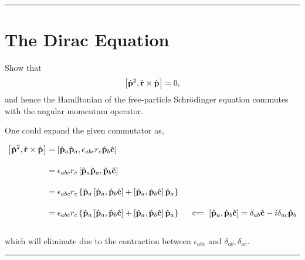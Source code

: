 
\noindent\rule{7in}{2.8pt}
\section{The Dirac Equation}
    
\begin{problem}{4.1}
Show that
\begin{align*}
    \left[ \hat{\mathbf{p}}^2,\hat{\mathbf{r}}\times \hat{\mathbf{p}}\right]=0,
\end{align*}
and hence the Hamiltonian of the free-particle Schrödinger equation commutes with the angular momentum operator.
\end{problem}
\begin{solution}
One could expand the given commutator as, 

\begin{align*}
    \left[ \hat{\mathbf{p}}^2 , \hat{\mathbf{r}} \times \hat{\mathbf{p}} \right] &=  \left[ \hat{\mathbf{p}}_a\hat{\mathbf{p}}_a,\epsilon_{abc}r_c \hat{\mathbf{p}}_b \hat{\mathbf{c}} \right]\\[0.15in]
        &= \epsilon_{abc}r_c \left[ \hat{\mathbf{p}}_a\hat{\mathbf{p}}_a,\hat{\mathbf{p}}_b \hat{\mathbf{c}} \right]\\[0.15in]
        &= \epsilon_{abc}r_c \left\{ \hat{\mathbf{p}}_a \left[ \hat{\mathbf{p}}_a,\hat{\mathbf{p}}_b \hat{\mathbf{c}} \right] + \left[ \hat{\mathbf{p}}_a,\hat{\mathbf{p}}_b \hat{\mathbf{c}} \right] \hat{\mathbf{p}}_a  \right\} \\[0.15in]
        &= \epsilon_{abc}r_c \left\{ \hat{\mathbf{p}}_a \left[ \hat{\mathbf{p}}_a,\hat{\mathbf{p}}_b \hat{\mathbf{c}} \right] + \left[ \hat{\mathbf{p}}_a,\hat{\mathbf{p}}_b \hat{\mathbf{c}} \right] \hat{\mathbf{p}}_a  \right\} \quad \impliedby  \left[ \hat{\mathbf{p}}_a,\hat{\mathbf{p}}_b \hat{\mathbf{c}} \right] = \delta_{ab} \hat{\mathbf{c}} - i \delta_{ac} \hat{\mathbf{p}}_b
\end{align*}\\
which will eliminate due to the contraction between $\epsilon_{abc}$ and $\delta_{ab},\delta_{ac}$. 
\end{solution}

\noindent\rule{7in}{1.5pt}


